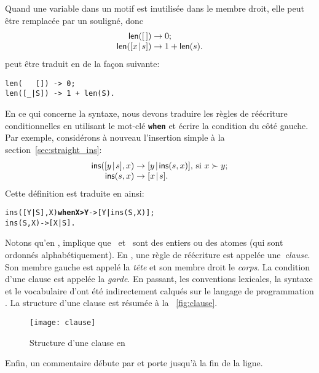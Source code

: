 Quand une variable dans un motif est inutilisée dans le membre droit,
elle peut être remplacée par un souligné, donc
\begin{equation*}
\begin{array}{@{}r@{\;}l@{\;}l@{}}
\fun{len}(\el)         & \rightarrow & 0;\\
\fun{len}(\cons{x}{s}) & \rightarrow & 1 + \fun{len}(s).
\end{array}
\end{equation*}
peut être traduit en \Erlang de la façon suivante:
\begin{verbatim}
len(   []) -> 0;
len([_|S]) -> 1 + len(S).
\end{verbatim}
En ce qui concerne la syntaxe, nous devons traduire les règles de
réécriture conditionnelles en utilisant le mot-clé
\texttt{\textbf{when}} et écrire la condition du côté gauche. Par
exemple, considérons à nouveau l'insertion simple à la
section~\ref{sec:straight_ins}:
\begin{equation*}
\begin{array}{@{}r@{\;}l@{\;}l@{}}
\fun{ins}(\cons{y}{s},x) & \rightarrow &
\cons{y}{\fun{ins}(s,x)}, \,\text{si \(x \succ y\)};\\
\fun{ins}(s,x) & \rightarrow & \cons{x}{s}.
\end{array}
\end{equation*}
Cette définition est traduite en \Erlang ainsi:
\begin{alltt}
ins([Y|S],X) \textbf{when X > Y} -> [Y|ins(S,X)];
ins(    S,X)            -> [X|S].
\end{alltt}
Notons qu'en \Erlang,  implique que
~et~ sont des entiers ou des atomes (qui sont
ordonnés alphabétiquement). En \Erlang, une règle de réécriture est
appelée une~\emph{clause}. Son membre gauche est appelé la \emph{tête}
et son membre droit le \emph{corps}. La condition d'une clause est
appelée la \emph{garde}. En passant, les conventions lexicales, la
syntaxe et le vocabulaire d'\Erlang ont été indirectement calqués sur
le langage de programmation \Prolog
\citep{SterlingShapiro_1994,Bratko_2000}. La structure d'une clause
\Erlang est résumée à la \fig~\vref{fig:clause}.
\begin{figure}[t]
\centering
\texttt{[image: clause]}
\caption{Structure d'une clause en \Erlang}
\label{fig:clause}
\end{figure}

Enfin, un commentaire débute par \erlcode{\%} et porte jusqu'à la fin
de la ligne.

